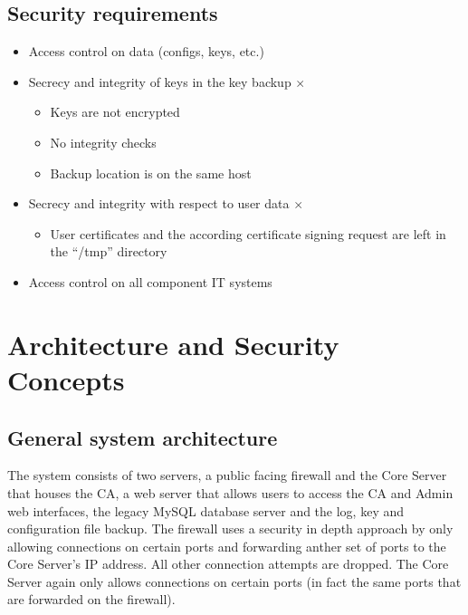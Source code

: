 \documentclass{article}
\begin{document}
\subsection{Security requirements}
\begin{itemize}
\item Access control on data (configs, keys, etc.) \checkmark
\item Secrecy and integrity of keys in the key backup $\times$
	\begin{itemize}
	\item Keys are not encrypted
	\item No integrity checks
	\item Backup location is on the same host
	\end{itemize}
\item Secrecy and integrity with respect to user data $\times$
	\begin{itemize}
	\item User certificates and the according certificate signing request are left in the ``/tmp'' directory
	\end{itemize}
\item Access control on all component IT systems \checkmark
\end{itemize}

\section{Architecture and Security Concepts}
\subsection{General system architecture}
The system consists of two servers, a public facing firewall and the Core Server that houses the CA, a web server that allows users to access the CA and Admin web interfaces, the legacy MySQL database server and the log, key and configuration file backup.\newline
The firewall uses a security in depth approach by only allowing connections on certain ports and forwarding anther set of ports to the Core Server's IP address. All other connection attempts are dropped.\newline
The Core Server again only allows connections on certain ports (in fact the same ports that are forwarded on the firewall).
\end{document}
